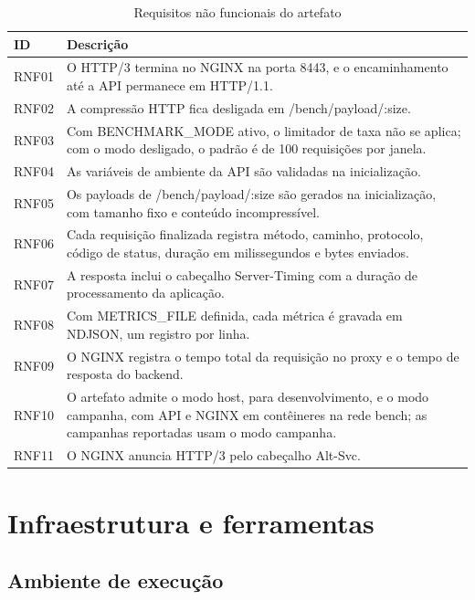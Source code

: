 \begin{table}[H]
\centering
\caption{Requisitos não funcionais do artefato}\label{tab:requisitos-nao-funcionais}
\small
\setlength{\tabcolsep}{3pt}
\begin{tabular}{@{}>{\raggedright\arraybackslash}p{22mm}>{\raggedright\arraybackslash}p{124mm}@{}}
\hline
\textbf{ID} & \textbf{Descrição} \\
\hline
RNF01 & O HTTP/3 termina no NGINX na porta 8443, e o encaminhamento até a API permanece em HTTP/1.1. \\
RNF02 & A compressão HTTP fica desligada em /bench/payload/:size. \\
RNF03 & Com BENCHMARK\_MODE ativo, o limitador de taxa não se aplica; com o modo desligado, o padrão é de 100 requisições por janela. \\
RNF04 & As variáveis de ambiente da API são validadas na inicialização. \\
RNF05 & Os payloads de /bench/payload/:size são gerados na inicialização, com tamanho fixo e conteúdo incompressível. \\
RNF06 & Cada requisição finalizada registra método, caminho, protocolo, código de status, duração em milissegundos e bytes enviados. \\
RNF07 & A resposta inclui o cabeçalho Server-Timing com a duração de processamento da aplicação. \\
RNF08 & Com METRICS\_FILE definida, cada métrica é gravada em NDJSON, um registro por linha. \\
RNF09 & O NGINX registra o tempo total da requisição no proxy e o tempo de resposta do backend. \\
RNF10 & O artefato admite o modo host, para desenvolvimento, e o modo campanha, com API e NGINX em contêineres na rede bench; as campanhas reportadas usam o modo campanha. \\
RNF11 & O NGINX anuncia HTTP/3 pelo cabeçalho Alt-Svc. \\
\hline
\end{tabular}
\end{table}

\section{Infraestrutura e ferramentas}

\subsection{Ambiente de execução}

